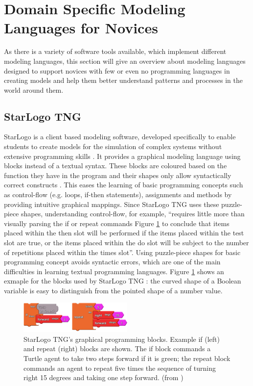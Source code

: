 \documentclass[runningheads,a4paper]{llncs}
\begin{document}
 \section{Domain Specific Modeling Languages for Novices}
 As there is a variety of software tools available, which implement different modeling languages, this section will give an overview 
 about modeling languages designed to support novices with few or even no programming languages in creating models and help them better 
 understand patterns and processes in the world around them.
 
 \subsection{StarLogo TNG}
  StarLogo is a client based modeling software, developed specifically to enable students to 
  create models for the simulation of complex systems without extensive programming skills \cite{klopfer2009starlogo}.
  It provides a graphical modeling language using blocks instead of a textual syntax. 
  These blocks are coloured based on the function they have in the program and their shapes only allow syntactically correct constructs \cite{klopfer2009starlogo}.
  This eases the learning of basic programming concepts such as control-flow (e.g. loops, if-then statements),
  assignments and methods by providing intuitive graphical mappings. Since StarLogo TNG uses these puzzle-piece shapes, understanding 
  control-flow, for example, ``requires little more than visually parsing the if or repeat commands 
  Figure \ref{fig1} to conclude that items placed within the then slot will be performed if the items placed within the 
  test slot are true, or the items placed within the do slot will be subject to the number of repetitions placed within the times slot''\cite{smith2011biology}.
  Using puzzle-piece shapes for basic programming concept avoids syntactic errors, 
  which are one of the main difficulties in learning textual programming languages.
  Figure \ref{fig1} shows an exmaple for the blocks used by StarLogo TNG : 
  the curved shape of a Boolean variable is easy to distinguish from the pointed shape of a number value.
  
  \begin{figure}[H]
	\centering
  \includegraphics[width=0.5\textwidth]{images/StarLogoTNGBlocksEx.PNG}
	\caption{ StarLogo TNG’s graphical programming blocks. Example if (left) and repeat (right) blocks are shown. The
	  if block commands a Turtle agent to take two steps forward if it is green; the repeat block commands an agent to
	  repeat five times the sequence of turning right 15 degrees and taking one step forward. (from \cite{smith2011biology})}
	\label{fig1}
  \end{figure}
  
\end{document}
